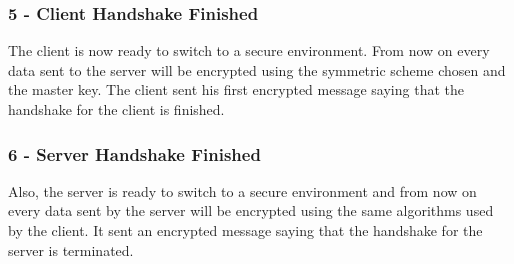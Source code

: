 \subsubsection{5 - Client Handshake Finished}
The client is now ready to switch to a secure environment. From now on every data sent to the server will be encrypted using the symmetric scheme chosen and the master key. The client sent his first encrypted message saying that the handshake for the client is finished.

\subsubsection{6 - Server Handshake Finished}
Also, the server is ready to switch to a secure environment and from now on every data sent by the server will be encrypted using the same algorithms used by the client. It sent an encrypted message saying that the handshake for the server is terminated.

